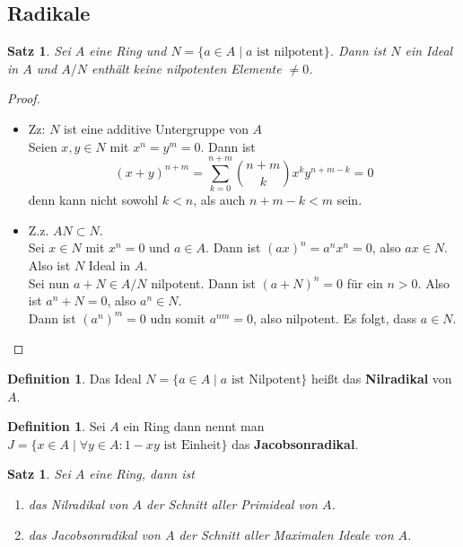 \documentclass[10pt,a4paper]{article}
\theoremstyle{plain}
\newtheorem{satz}[theorem]{Satz}
\theoremstyle{definition}
\newtheorem{definition}[theorem]{Definition}
\theoremstyle{remark}
\begin{document}
	\subsection{Radikale}
	\begin{satz}
		Sei $A$ eine Ring und $N=\{a\in A\mid \text{$a$ ist nilpotent}\}$. Dann ist $N$ ein Ideal in $A$ und $A/N$ enthält keine nilpotenten Elemente $\neq 0$.
	\end{satz}
	\begin{proof}
		\begin{itemize}
			\item Zz: $N$ ist eine additive Untergruppe von $A$\\
			Seien $x,y\in N$ mit $x^n=y^m=0$. Dann ist
			\[(x+y)^{n+m}=\sum_{k=0}^{n+m}\binom{n+m}{k}x^ky^{n+m-k}=0\]
			denn kann nicht sowohl $k<n$, als auch $n+m-k<m$ sein.
			\item Z.z. $AN\subset N$.\\
			Sei $x\in N$ mit $x^n=0$ und $a\in A$.
			Dann ist $(ax)^n=a^nx^n=0$, also $ax\in N$.\\
			Also ist $N$ Ideal in $A$.\\
			Sei nun $a+N\in A/N$ nilpotent. Dann ist $(a+N)^n=0$ für ein $n>0$. Also ist $a^n+N=0$, also $a^n\in N$.\\
			Dann ist $(a^n)^m=0$ udn somit $a^{nm}=0$, also nilpotent. Es folgt, dass $a\in N$.
		\end{itemize}
	\end{proof}

	\begin{definition}
		Das Ideal $N=\{a\in A\mid\text{$a$ ist Nilpotent}\}$ heißt das \textbf{Nilradikal} von $A$.
	\end{definition}

	\begin{definition}
		Sei $A$ ein Ring dann nennt man $J=\{x\in A\mid \forall y\in A:\text{$1-xy$ ist Einheit}\}$ das \textbf{Jacobsonradikal}.
	\end{definition}

	\begin{satz}
		Sei $A$ eine Ring, dann ist 
		\begin{enumerate}
			\item das Nilradikal von $A$ der Schnitt aller Primideal von $A$.
			\item das Jacobsonradikal von $A$ der Schnitt aller Maximalen Ideale von $A$.
		\end{enumerate}
	\end{satz}
\end{document}
